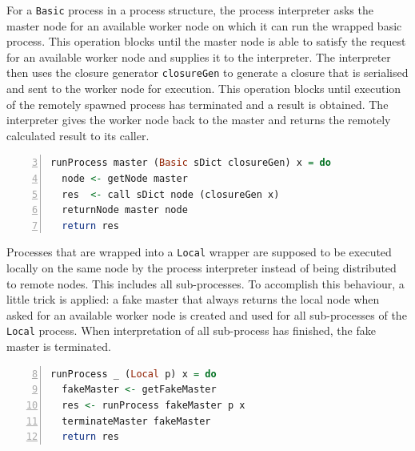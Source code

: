 For a \texttt{Basic} process in a process structure, the process interpreter asks the master node for an available worker node on which it can run the wrapped basic process. This operation blocks until the master node is able to satisfy the request for an available worker node and supplies it to the interpreter. The interpreter then uses the closure generator \texttt{closureGen} to generate a closure that is serialised and sent to the worker node for execution. This operation blocks until execution of the remotely spawned process has terminated and a result is obtained. The interpreter gives the worker node back to the master and returns the remotely calculated result to its caller.
\begin{lstlisting}[language=Haskell,caption=Implementation of the interpreter for \texttt{Basic} processes.,label=lst:runprocess_simple,numbers=left,frame=bt,firstnumber=3]
runProcess master (Basic sDict closureGen) x = do
  node <- getNode master
  res  <- call sDict node (closureGen x)
  returnNode master node
  return res
\end{lstlisting}

\vspace*{-0.5em}
Processes that are wrapped into a \texttt{Local} wrapper are supposed to be executed locally on the same node by the process interpreter instead of being distributed to remote nodes. This includes all sub-processes. To accomplish this behaviour, a little trick is applied: a fake master that always returns the local node when asked for an available worker node is created and used for all sub-processes of the \texttt{Local} process. When interpretation of all sub-process has finished, the fake master is terminated.
\begin{lstlisting}[language=Haskell,caption=Implementation of the interpreter for \texttt{Local} processes.,label=lst:runprocess_local,numbers=left,frame=bt,firstnumber=8]
runProcess _ (Local p) x = do
  fakeMaster <- getFakeMaster
  res <- runProcess fakeMaster p x
  terminateMaster fakeMaster
  return res
\end{lstlisting}

